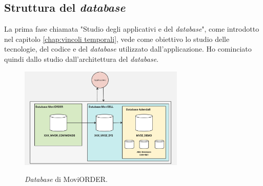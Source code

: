 \subsection{Struttura del \textit{database}}\label{chap:struttura database}
La prima fase chiamata "Studio degli applicativi e del \textit{database}", come introdotto nel capitolo \ref{chap:vincoli temporali}, 
vede come obiettivo lo studio delle tecnologie, del codice e del \textit{database} utilizzato dall'applicazione. Ho cominciato quindi 
dallo studio dall'architettura del \textit{database}.\\

\begin{figure}[H]
    \centering
    \includegraphics[alt={\textit{Database} di MoviORDER}, width=0.7\textwidth]{img/database.png}
    \caption {\textit{Database} di MoviORDER.}
    \label{fig:database}
\end{figure}

